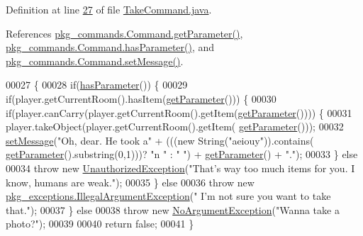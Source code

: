 Definition at line \hyperlink{TakeCommand_8java_source_l00027}{27} of file \hyperlink{TakeCommand_8java_source}{Take\-Command.\-java}.



References \hyperlink{Command_8java_source_l00034}{pkg\-\_\-commands.\-Command.\-get\-Parameter()}, \hyperlink{Command_8java_source_l00050}{pkg\-\_\-commands.\-Command.\-has\-Parameter()}, and \hyperlink{Command_8java_source_l00058}{pkg\-\_\-commands.\-Command.\-set\-Message()}.


\begin{DoxyCode}
00027                                                                                                            
                              \{
00028         \textcolor{keywordflow}{if}(\hyperlink{classpkg__commands_1_1Command_a02af95ab3f1898a66259ab7c177b6998}{hasParameter}()) \{
00029             \textcolor{keywordflow}{if}(player.getCurrentRoom().hasItem(\hyperlink{classpkg__commands_1_1Command_a41c92d445be73ea9d62320c65efb8434}{getParameter}())) \{
00030                 \textcolor{keywordflow}{if}(player.canCarry(player.getCurrentRoom().getItem(\hyperlink{classpkg__commands_1_1Command_a41c92d445be73ea9d62320c65efb8434}{getParameter}()))) \{
00031                     player.takeObject(player.getCurrentRoom().getItem(
      \hyperlink{classpkg__commands_1_1Command_a41c92d445be73ea9d62320c65efb8434}{getParameter}()));
00032                     \hyperlink{classpkg__commands_1_1Command_ae210ff216fe908b111ba1c988a963d13}{setMessage}(\textcolor{stringliteral}{"Oh, dear. He took a"} + (((\textcolor{keyword}{new} String(\textcolor{stringliteral}{"aeiouy"})).contains(
      \hyperlink{classpkg__commands_1_1Command_a41c92d445be73ea9d62320c65efb8434}{getParameter}().substring(0,1)))? \textcolor{stringliteral}{"n "} : \textcolor{stringliteral}{" "}) + \hyperlink{classpkg__commands_1_1Command_a41c92d445be73ea9d62320c65efb8434}{getParameter}() + \textcolor{stringliteral}{"."});
00033                 \} \textcolor{keywordflow}{else}
00034                     \textcolor{keywordflow}{throw} \textcolor{keyword}{new} \hyperlink{classpkg__exceptions_1_1UnauthorizedException}{UnauthorizedException}(\textcolor{stringliteral}{"That's way too much items for
       you. I know, humans are weak."});
00035             \} \textcolor{keywordflow}{else}
00036                 \textcolor{keywordflow}{throw} \textcolor{keyword}{new} \hyperlink{classpkg__exceptions_1_1IllegalArgumentException}{pkg\_exceptions.IllegalArgumentException}(\textcolor{stringliteral}{"
      I'm not sure you want to take that."});
00037         \} \textcolor{keywordflow}{else}
00038             \textcolor{keywordflow}{throw} \textcolor{keyword}{new} \hyperlink{classpkg__exceptions_1_1NoArgumentException}{NoArgumentException}(\textcolor{stringliteral}{"Wanna take a photo?"});
00039 
00040         \textcolor{keywordflow}{return} \textcolor{keyword}{false};
00041     \}
\end{DoxyCode}


